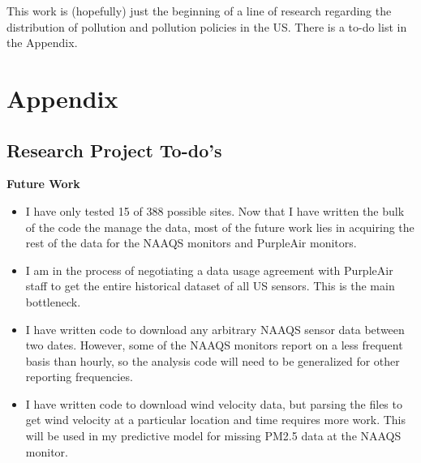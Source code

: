 \documentclass[12pt]{article}
\begin{document}
This work is (hopefully) just the beginning of a line of research regarding the distribution of pollution and pollution policies in the US. There is a to-do list in the Appendix.











\newpage


% 
%



\newpage
\section{Appendix}

\subsection{Research Project To-do's} \label{sec:todo}

\textbf{Future Work}
\begin{itemize}
    \item I have only tested 15 of 388 possible sites. Now that I have written the bulk of the code the manage the data, most of the future work lies in acquiring the rest of the data for the NAAQS monitors and PurpleAir monitors.
    \item I am in the process of negotiating a data usage agreement with PurpleAir staff to get the entire historical dataset of all US sensors. This is the main bottleneck.
    \item I have written code to download any arbitrary NAAQS sensor data between two dates. However, some of the NAAQS monitors report on a less frequent basis than hourly, so the analysis code will need to be generalized for other reporting frequencies.
    \item I have written code to download wind velocity data, but parsing the files to get wind velocity at a particular location and time requires more work. This will be used in my predictive model for missing PM2.5 data at the NAAQS monitor.
\end{itemize}
\end{document}
